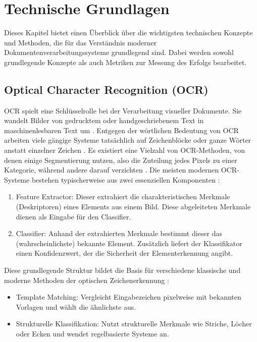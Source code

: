 \chapter{Technische Grundlagen}
\label{cha:technische-grundlagen}

Dieses Kapitel bietet einen Überblick über die wichtigsten technischen Konzepte und Methoden, die für das Verständnis moderner Dokumentenverarbeitungssysteme grundlegend sind. Dabei werden sowohl grundlegende Konzepte als auch Metriken zur Messung des Erfolgs bearbeitet. 

\section{Optical Character Recognition (OCR)}
\label{sec:optical-character-recognition-ocr}

\gls{OCR} spielt eine Schlüsselrolle bei der Verarbeitung visueller Dokumente. 
Sie wandelt Bilder von gedrucktem oder handgeschriebenem Text in maschinenlesbaren Text um \cite{MoriS.1992HroO}.
Entgegen der wörtlichen Bedeutung von \gls{OCR} arbeiten viele gängige Systeme tatsächlich auf Zeichenblöcke oder ganze Wörter anstatt einzelner Zeichen \cite{BorovikovEugene2014Asom}.
Es existiert eine Vielzahl von \gls{OCR}-Methoden, von denen einige Segmentierung nutzen, also die Zuteilung jedes Pixels zu einer Kategorie, während andere darauf verzichten \cite{BorovikovEugene2014Asom}. 
Die meisten modernen \gls{OCR}-Systeme bestehen typischerweise aus zwei essenziellen Komponenten \cite{BorovikovEugene2014Asom}:

\begin{enumerate}
	\item Feature Extractor: Dieser extrahiert die charakteristischen Merkmale (Deskriptoren) eines Elements aus einem Bild. Diese abgeleiteten Merkmale dienen als Eingabe für den Classifier.
	\item Classifier: Anhand der extrahierten Merkmale bestimmt dieser das (wahrscheinlichste) bekannte Element. Zusätzlich liefert der Klassifikator einen Konfidenzwert, der die Sicherheit der Elementerkennung angibt.
\end{enumerate}

Diese grundlegende Struktur bildet die Basis für verschiedene klassische und moderne Methoden der optischen Zeichenerkennung \cite{BorovikovEugene2014Asom}:

\begin{itemize}
	\item Template Matching: Vergleicht Eingabezeichen pixelweise mit bekannten Vorlagen und wählt die ähnlichste aus.
	\item Strukturelle Klassifikation: Nutzt strukturelle Merkmale wie Striche, Löcher oder Ecken und wendet regelbasierte Systeme an.
\end{itemize}

